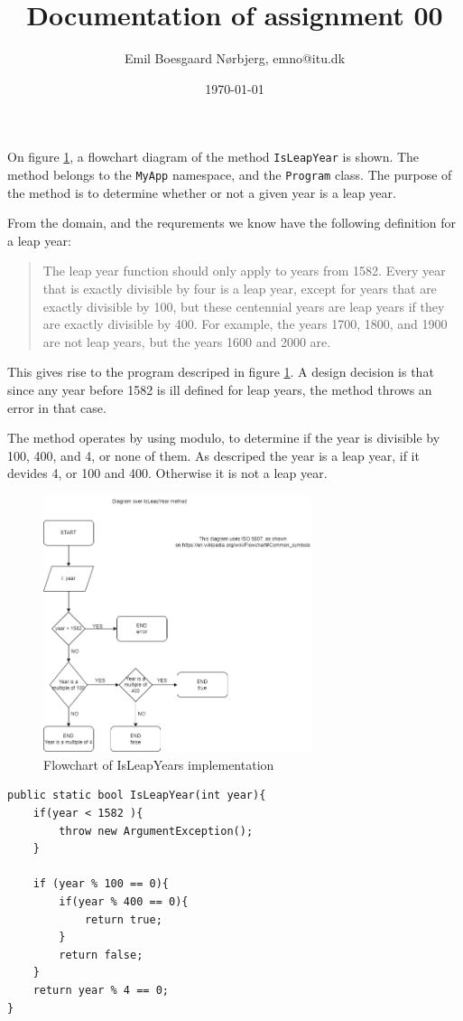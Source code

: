 \documentclass[10pt, a4paper]{article}
\author{Emil Boesgaard Nørbjerg, emno@itu.dk}
\date{\today}
\title{Documentation of assignment 00}
\begin{document}
\maketitle
On figure \ref{fig:IsLeapYear}, a flowchart diagram of the method \verb!IsLeapYear! is shown.
The method belongs to the \verb!MyApp! namespace, and the \verb!Program! class.
The purpose of the method is to determine whether or not a given year is a leap year.

From the domain, and the requrements we know have the following definition for a leap year:
\begin{quote}
    The leap year function should only apply to years from 1582.
    Every year that is exactly divisible by four is a leap year, except for years that are exactly divisible by 100, but these centennial years are leap years if they are exactly divisible by 400. 
    For example, the years 1700, 1800, and 1900 are not leap years, but the years 1600 and 2000 are.
\end{quote}

This gives rise to the program descriped in figure \ref{fig:IsLeapYear}.
A design decision is that since any year before 1582 is ill defined for leap years, the method throws an error in that case.

The method operates by using modulo, to determine if the year is divisible by 100, 400, and 4, or none of them.
As descriped the year is a leap year, if it devides 4, or 100 and 400. 
Otherwise it is not a leap year. 

\begin{figure}[htbp]
    \centering
    \includegraphics[width=0.7\textwidth]{pic/LeapDocu.png}
    \caption{Flowchart of IsLeapYears implementation}
    \label{fig:IsLeapYear}
\end{figure}

\begin{lstlisting}[caption="Listing of c\# code"]
public static bool IsLeapYear(int year){
    if(year < 1582 ){
        throw new ArgumentException();
    }

    if (year % 100 == 0){
        if(year % 400 == 0){
            return true;
        }
        return false;
    }
    return year % 4 == 0;
}
\end{lstlisting}
\end{document}
